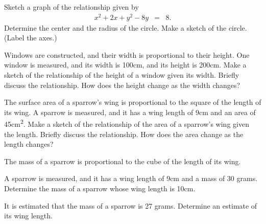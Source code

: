 \begin{problem}
\item Sketch a graph of the relationship given by
  \begin{eqnarray*}
    x^2 + 2x + y^2 - 8y & = & 8.
  \end{eqnarray*}
  Determine the center and the radius of the circle.
  Make a sketch of the circle. (Label the axes.)
  \vfill

  \clearpage

\item Windows are constructed, and their width is proportional to
  their height. One window is measured, and its width is 100cm, and its
  height is 200cm. Make a sketch of the relationship of the height of
  a window given its width. Briefly discuss the relationship. How does
  the height change as the width changes?

  \vfill

\item The surface area of a sparrow's wing is proportional to the
  square of the length of its wing. A sparrow is measured, and it has
  a wing length of 9cm and an area of 45cm\textsuperscript{2}. Make a
  sketch of the relationship of the area of a sparrow's wing given the
  length. Briefly discuss the relationship. How does the area change
  as the length changes?

  \vfill

\clearpage

\item The mass of a sparrow is proportional to the cube of the length of its wing.
  \begin{subproblem}
    \item \label{sparrowWingArea} A sparrow is measured, and it has a wing length of 9cm and a mass of 30 grams.
    Determine the mass of a sparrow whose wing length is 10cm.
    \vfill

    \item \label{sparrowMass} It is estimated that the mass of a sparrow is 27 grams. Determine an estimate
    of its wing length.
    \vfill
  \end{subproblem}

\end{problem}

\postClass

